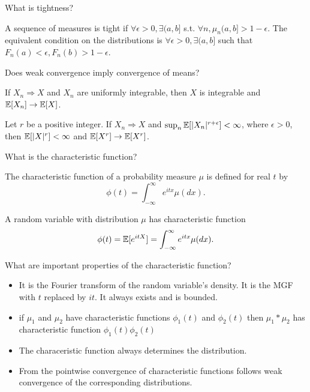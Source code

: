 \documentclass[avery5388,grid,frame]{flashcards}
\begin{document}
\begin{flashcard}
    {What is tightness?}
    \begin{definition}
        A sequence of measures is tight if $\forall \epsilon > 0, \exists (a,b]$ s.t. $\forall n, \mu_n(a,b] > 1 - \epsilon$. The equivalent condition on the distributions is $\forall \epsilon > 0, \exists (a,b]$ such that $F_n(a) < \epsilon, F_n(b) > 1 - \epsilon$.
    \end{definition}
\end{flashcard}


\begin{flashcard}
    {Does weak convergence imply convergence of means?}
    \begin{theorem}
        If $X_n \Rightarrow X$ and $X_n$ are uniformly integrable, then $X$ is integrable and $\mathbb{E}[X_n] \rightarrow \mathbb{E}[X]$.
    \end{theorem}

    \begin{theorem}
        Let $r$ be a positive integer. If $X_n \Rightarrow X$ and $\sup_n \mathbb{E}[|X_n|^{r+\epsilon}] < \infty$, where $\epsilon > 0$, then $\mathbb{E}[|X|^r] < \infty$ and $\mathbb{E}[X^r] \rightarrow \mathbb{E}[X^r]$.
    \end{theorem}
\end{flashcard}


\begin{flashcard}
    {What is the characteristic function? }
    \begin{definition}
        The characteristic function of a probability measure $\mu$ is defined for real $t$ by
        $$\phi(t) = \int_{-\infty}^\infty e^{itx} \mu(dx).$$

        A random variable with distribution $\mu$ has characteristic function
        $$\phi(t) = \mathbb{E}[e^{itX}] = \int_{-\infty}^\infty e^{itx} \mu(dx).$$
    \end{definition}
\end{flashcard}


\begin{flashcard}
    {What are important properties of the characteristic function?}
    \begin{properties}
        \begin{itemize}
            \item It is the Fourier transform of the random variable's density. It is the MGF with $t$ replaced by $it$. It always exists and is bounded.
            \item if $\mu_1$ and $\mu_2$ have characteristic functions $\phi_1(t)$ and $\phi_2(t)$ then $\mu_1 * \mu_2$ has characteristic function $\phi_1(t) \phi_2(t)$
            \item The characeristic function always determines the distribution.
            \item From the pointwise convergence of characteristic functions follows weak convergence of the corresponding distributions.
        \end{itemize}
    \end{properties}
\end{flashcard}
\end{document}
